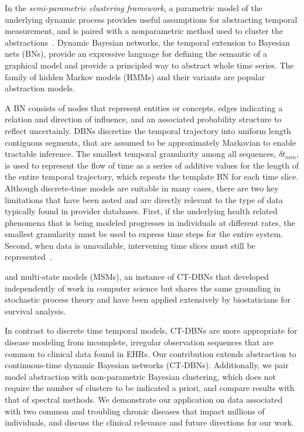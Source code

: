 In the \emph{semi-parametric clustering framework}, a parametric model of the underlying dynamic process provides useful assumptions for abstracting temporal measurement, and is paired with a nonparametric method used to cluster the abstractions~\cite{JebSonTha07a}.  Dynamic Bayesian networks, the temporal extension to Bayesian nets (BNs), provide an expressive language for defining the semantic of a graphical model and provide a principled way to abstract whole time series.  The family of hidden Markov models (HMMs) and their variants are popular abstraction models.

A BN consists of nodes that represent entities or concepts, edges indicating a relation and direction of influence, and an associated probability structure to reflect uncertainly.  DBNs discretize the temporal trajectory into uniform length contiguous segments, that are assumed to be approximately Markovian to enable tractable inference.  The smallest temporal granularity among all sequences, $\delta t_{min}$, is used to represent the flow of time as a series of additive values for the length of the entire temporal trajectory, which repeats the template BN for each time slice.
Although discrete-time models are suitable in many cases, there are two key limitations that have been noted and are directly relevant to the type of data typically found in provider databases. First, if the underlying health related phenomena that is being modeled progresses in individuals at different rates, the smallest granularity must be used to express time steps for the entire system. Second, when data is unavailable, intervening time slices must still be represented~\cite{Nodelman02,SariaNK07}.

 and multi-state models (MSMs), an instance of CT-DBNs that developed independently of work in computer science but shares the same grounding in stochastic process theory and have been applied extensively by biostaticians for survival analysis.

In contrast to discrete time temporal models, CT-DBNs are more appropriate for disease modeling from incomplete, irregular observation sequences that are common to clinical data found in EHRs.  Our contribution extends abstraction to continuous-time dynamic Bayesian networks (CT-DBNs).  Additionally, we pair model abstraction with non-parametric Bayesian clustering, which does not require the number of clusters to be indicated a priori, and compare results with that of spectral methods.  We demonstrate our application on data associated with two common and troubling chronic diseases that impact millions of individuals, and discuss the clinical relevance and future directions for our work.



